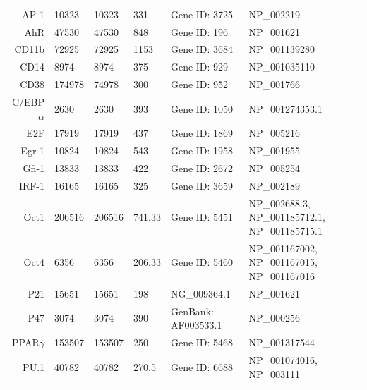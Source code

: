 \documentclass[12pt]{article}
\begin{document}
\begin{center}
\begin{scriptsize}
\begin{supertabular}{c|l|l|l|l}
	\hline
	\end{supertabular}
	\end{scriptsize}

\end{center}

\clearpage

\begin{center}
\label{tbl:TF-sequences}
\begin{scriptsize}
\begin{supertabular}{r|l|l|l|l|l}
\hline
AP-1 &  10323 & 10323 & 331 & Gene ID: 3725 & NP\_002219\\
AhR &  47530 & 47530 & 848 & Gene ID: 196 & NP\_001621\\
CD11b &  72925 & 72925 & 1153 & Gene ID: 3684 & NP\_001139280 \\
CD14 &  8974 & 8974 & 375 & Gene ID: 929 & NP\_001035110\\
CD38 &  174978 & 74978 & 300 & Gene ID: 952 & NP\_001766\\
C/EBP$\alpha$ &  2630 & 2630 & 393 & Gene ID: 1050 & NP\_001274353.1\\
E2F &  17919 & 17919 & 437 & Gene ID: 1869 & NP\_005216\\
Egr-1 &  10824 & 10824 & 543 & Gene ID: 1958 & NP\_001955\\
Gfi-1 &  13833 & 13833 & 422 & Gene ID: 2672 & NP\_005254\\
IRF-1 &  16165 & 16165 & 325 & Gene ID: 3659 & NP\_002189\\
Oct1 &  206516 & 206516 & 741.33 & Gene ID: 5451 & NP\_002688.3, NP\_001185712.1, NP\_001185715.1\\
Oct4 &  6356 & 6356 & 206.33 &Gene ID: 5460 & NP\_001167002, NP\_001167015, NP\_001167016\\
P21 &  15651 & 15651 & 198 & NG\_009364.1 & NP\_001621\\
P47 &  3074 & 3074 & 390 & GenBank: AF003533.1 & NP\_000256 \\
PPAR$\gamma$ &  153507 & 153507 & 250 & Gene ID: 5468 &  NP\_001317544\\
PU.1 &  40782 & 40782 & 270.5 & Gene ID: 6688 & NP\_001074016, NP\_003111 \\

\hline
\end{supertabular}
\end{scriptsize}
\end{center}
\end{document}
